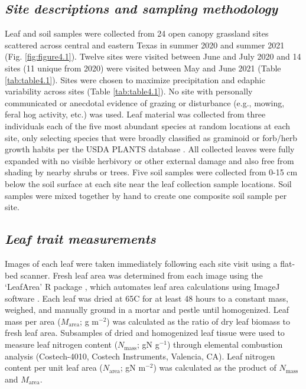 \subsection{\textit{Site descriptions and sampling methodology}}
\noindent Leaf and soil samples were collected from 24 open canopy grassland sites scattered across central and eastern Texas in summer 2020 and summer 2021 (Fig. \ref{fig:figure4.1}). Twelve sites were visited between June and July 2020 and 14 sites (11 unique from 2020) were visited between May and June 2021 (Table \ref{tab:table4.1}). Sites were chosen to maximize precipitation and edaphic variability across sites (Table \ref{tab:table4.1}). No site with personally communicated or anecdotal evidence of grazing or disturbance (e.g., mowing, feral hog activity, etc.) was used. Leaf material was collected from three individuals each of the five most abundant species at random locations at each site, only  selecting species that were broadly classified as graminoid or forb/herb growth habits per the USDA PLANTS database . All collected leaves were fully expanded with no visible herbivory or other external damage and also free from shading by nearby shrubs or trees. Five soil samples were collected from 0-15 cm below the soil surface at each site near the leaf collection sample locations. Soil samples were mixed together by hand to create one composite soil sample per site.

\subsection{\textit{Leaf trait measurements}}
\noindent Images of each leaf were taken immediately following each site visit using a flat-bed scanner. Fresh leaf area was determined from each image using the `LeafArea' R package , which automates leaf area calculations using ImageJ software . Each leaf was dried at 65\textdegree{}C for at least 48 hours to a constant mass, weighed, and manually ground in a mortar and pestle until homogenized. Leaf mass per area ($M_\mathrm{area}$; g m$^{-2}$) was calculated as the ratio of dry leaf biomass to fresh leaf area. Subsamples of dried and homogenized leaf tissue were used to measure leaf nitrogen content ($N_\mathrm{mass}$; gN g$^{-1}$) through elemental combustion analysis (Costech-4010, Costech Instruments, Valencia, CA). Leaf nitrogen content per unit leaf area ($N_\mathrm{area}$; gN m$^{-2}$) was calculated as the product of $N_\mathrm{mass}$ and $M_\mathrm{area}$.
    
